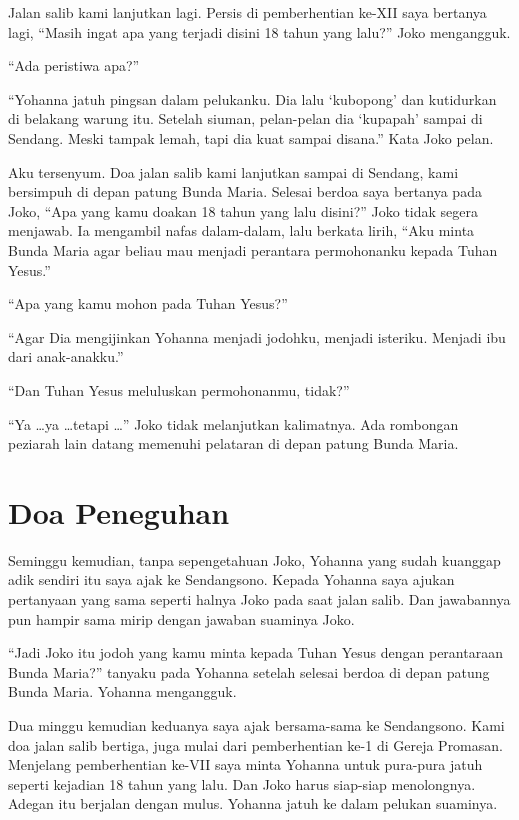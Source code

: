 Jalan salib kami lanjutkan lagi. Persis di pemberhentian ke-XII saya bertanya lagi, ``Masih ingat apa yang terjadi disini 18 tahun yang lalu?''
Joko mengangguk.

``Ada peristiwa apa?''

``Yohanna jatuh pingsan dalam pelukanku. Dia lalu `kubopong' dan kutidurkan di belakang warung itu. Setelah siuman, pelan-pelan dia `kupapah' sampai di Sendang. Meski tampak lemah, tapi dia kuat sampai disana.'' Kata Joko pelan.

Aku tersenyum. Doa jalan salib kami lanjutkan sampai di Sendang, kami bersimpuh di depan patung Bunda Maria. Selesai berdoa saya bertanya pada Joko, ``Apa yang kamu doakan 18 tahun yang lalu disini?''
Joko tidak segera menjawab. Ia mengambil nafas dalam-dalam, lalu berkata lirih, ``Aku minta Bunda Maria agar beliau mau menjadi perantara permohonanku kepada Tuhan Yesus.''

``Apa yang kamu mohon pada Tuhan Yesus?''

``Agar Dia mengijinkan Yohanna menjadi jodohku, menjadi isteriku. Menjadi ibu dari anak-anakku.''

``Dan Tuhan Yesus meluluskan permohonanmu, tidak?''

``Ya \ldots ya \ldots tetapi \ldots'' Joko tidak melanjutkan kalimatnya. Ada rombongan peziarah lain datang memenuhi pelataran di depan patung Bunda Maria.

\section*{Doa Peneguhan}

Seminggu kemudian, tanpa sepengetahuan Joko, Yohanna yang sudah kuanggap adik sendiri itu saya ajak ke Sendangsono. Kepada Yohanna saya ajukan pertanyaan yang sama seperti halnya Joko pada saat jalan salib. Dan jawabannya pun hampir sama mirip dengan jawaban suaminya Joko.

``Jadi Joko itu jodoh yang kamu minta kepada Tuhan Yesus dengan perantaraan  Bunda Maria?'' tanyaku pada Yohanna setelah selesai berdoa di depan patung Bunda Maria.
Yohanna mengangguk. 

Dua minggu kemudian keduanya saya ajak bersama-sama ke Sendangsono. Kami doa jalan salib bertiga, juga mulai dari pemberhentian ke-1 di Gereja Promasan. Menjelang pemberhentian ke-VII saya minta Yohanna untuk pura-pura jatuh seperti kejadian 18 tahun yang lalu. Dan Joko harus siap-siap menolongnya. Adegan itu berjalan dengan mulus. Yohanna jatuh ke dalam pelukan suaminya.

